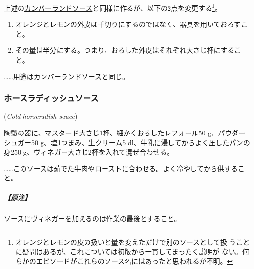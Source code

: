 \begin{recette}
上述の\protect\hyperlink{cumberland-sauce}{カンバーランドソース}と同様に作るが、以下の2点を変更する\footnote{オレンジとレモンの皮の扱いと量を変えただけで別のソースとして扱
  うことに疑問はあるが、これについては初版から一貫してまったく説明が
  ない。何らかのエピソードがこれらのソース名にはあったと思われるが不明。}。

\begin{enumerate}
\def\labelenumi{\arabic{enumi}.}
\item
  オレンジとレモンの外皮は千切りにするのではなく、器具を用いておろすこと。
\item
  その量は半分にする。つまり、おろした外皮はそれぞれ大さじ\undemi{}杯にすること。
\end{enumerate}

\ldots{}\ldots{}用途はカンバーランドソースと同じ。

\maeaki

\hypertarget{cold-horseradish-sauce}{%
\subsubsection{ホースラディッシュソース}\label{cold-horseradish-sauce}}

\hspace{1em}(\emph{Cold horseradish sauce})


陶製の器に、マスタード大さじ1杯、細かくおろしたレフォール50
g、パウダーシュガー50 g、塩1つまみ、生クリーム5
dl、牛乳に浸してからよく圧したパンの身250
g、ヴィネガー大さじ2杯を入れて混ぜ合わせる。

\ldots{}\ldots{}このソースは茹でた牛肉やローストに合わせる。よく冷やしてから供すること。

\hypertarget{ux539fux6ce8-2}{%
\subparagraph{【原注】}\label{ux539fux6ce8-2}}

ソースにヴィネガーを加えるのは作業の最後とすること。
\end{recette}
